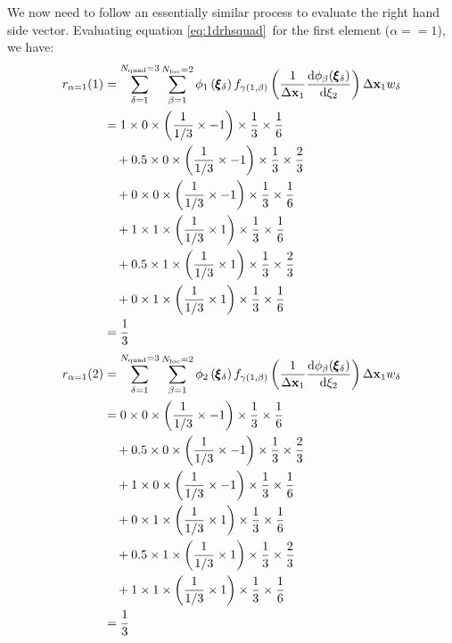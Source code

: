 \documentclass[a4paper, 11pt]{book}
\begin{document}
We now need to follow an essentially similar process to evaluate the right
hand side vector. Evaluating equation \eqref{eq:1drhsquad}\ for the first
element ($\alpha==1$), we have:
\begin{equation}
  \begin{split}
    r_{\alpha=1}(1)&=\sum_{\delta=1}^{N_\mathrm{quad}=3}\sum_{\beta=1}^{N_\mathrm{loc}=2} 
    \phi_1\left(\pmb{\xi}_\delta\right)
    f_{\gamma(1,\beta)}\left(\frac{1}{\Delta\mathbf{x}_1}
      \frac{\mathrm{d} \phi_{\beta}(\pmb{\xi}_\delta)}{\mathrm{d} \xi_2}\right)    
    \Delta\mathbf{x}_1 w_\delta\\
    &=1\times0\times\left(\frac{1}{1/3}\times-1\right)\times\frac{1}{3}\times\frac{1}{6}\\
    &\quad+0.5\times0\times\left(\frac{1}{1/3}\times-1\right)\times\frac{1}{3}\times\frac{2}{3}\\
    &\quad+0\times0\times\left(\frac{1}{1/3}\times-1\right)\times\frac{1}{3}\times\frac{1}{6}\\
    &\quad+1\times1\times\left(\frac{1}{1/3}\times1\right)\times\frac{1}{3}\times\frac{1}{6}\\
    &\quad+0.5\times1\times\left(\frac{1}{1/3}\times1\right)\times\frac{1}{3}\times\frac{2}{3}\\
    &\quad+0\times1\times\left(\frac{1}{1/3}\times1\right)\times\frac{1}{3}\times\frac{1}{6}\\
    &=\frac{1}{3}
  \end{split}
\end{equation}
\begin{equation}
  \begin{split}
    r_{\alpha=1}(2)&=\sum_{\delta=1}^{N_\mathrm{quad}=3}\sum_{\beta=1}^{N_\mathrm{loc}=2} 
    \phi_2\left(\pmb{\xi}_\delta\right)
    f_{\gamma(1,\beta)}\left(\frac{1}{\Delta\mathbf{x}_1}
      \frac{\mathrm{d} \phi_{\beta}(\pmb{\xi}_\delta)}{\mathrm{d} \xi_2}\right)    
    \Delta\mathbf{x}_1 w_\delta\\
    &=0\times0\times\left(\frac{1}{1/3}\times-1\right)\times\frac{1}{3}\times\frac{1}{6}\\
    &\quad+0.5\times0\times\left(\frac{1}{1/3}\times-1\right)\times\frac{1}{3}\times\frac{2}{3}\\
    &\quad+1\times0\times\left(\frac{1}{1/3}\times-1\right)\times\frac{1}{3}\times\frac{1}{6}\\
    &\quad+0\times1\times\left(\frac{1}{1/3}\times1\right)\times\frac{1}{3}\times\frac{1}{6}\\
    &\quad+0.5\times1\times\left(\frac{1}{1/3}\times1\right)\times\frac{1}{3}\times\frac{2}{3}\\
    &\quad+1\times1\times\left(\frac{1}{1/3}\times1\right)\times\frac{1}{3}\times\frac{1}{6}\\
    &=\frac{1}{3}
  \end{split}
\end{equation}
\end{document}
